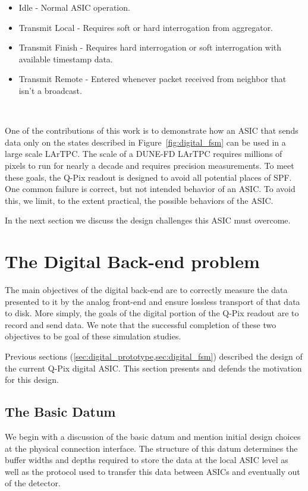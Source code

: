 \begin{itemize}
    \item Idle - Normal ASIC operation.
    \item Transmit Local - Requires soft or hard interrogation from aggregator.
    \item Transmit Finish - Requires hard interrogation or soft interrogation with available timestamp data.
    \item Transmit Remote - Entered whenever packet received from neighbor that isn't a broadcast.
\end{itemize}~\label{fsm_state_labels}

One of the contributions of this work is to demonstrate how an ASIC that sends data only on the states described in Figure~\ref{fig:digital_fsm} can be used in a large scale LArTPC.
The scale of a DUNE-FD LArTPC requires millions of pixels to run for nearly a decade and requires precision measurements.
To meet these goals, the Q-Pix readout is designed to avoid all potential places of SPF.
One common failure is correct, but not intended behavior of an ASIC.
To avoid this, we limit, to the extent practical, the possible behaviors of the ASIC.

In the next section we discuss the design challenges this ASIC must overcome.

\section{The Digital Back-end problem}\label{sec:digital_problem}
The main objectives of the digital back-end are to correctly measure the data presented to it by the analog front-end and ensure lossless transport of that data to disk.
More simply, the goals of the digital portion of the Q-Pix readout are to record and send data.
We note that the successful completion of these two objectives to be goal of these simulation studies.

Previous sections (\cref{sec:digital_prototype,sec:digital_fsm}) described the design of the current Q-Pix digital ASIC.
This section presents and defends the motivation for this design.

\subsection{The Basic Datum}
We begin with a discussion of the basic datum and mention initial design choices at the physical connection interface.
The structure of this datum determines the buffer widths and depths required to store the data at the local ASIC level as well as the protocol used to transfer this data between ASICs and eventually out of the detector.

